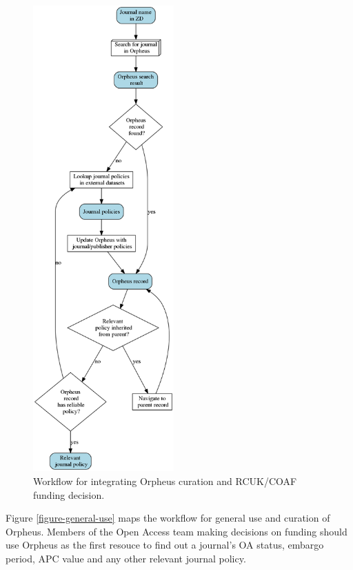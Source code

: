 \documentclass[british, 12pt]{article}
\begin{document}
\begin{figure}
  \begin{center}
     \includegraphics[width=0.48\textwidth]{initial-use}
  \end{center}
  \caption{Workflow for integrating Orpheus curation and RCUK/COAF funding decision.}
  \label{figure-general-use}
\end{figure}

Figure \vref{figure-general-use} maps the workflow for general use and curation of Orpheus. Members of the Open Access team making decisions on funding should use Orpheus as the first resouce to find out a journal's OA status, embargo period, APC value and any other relevant journal policy.
\end{document}

